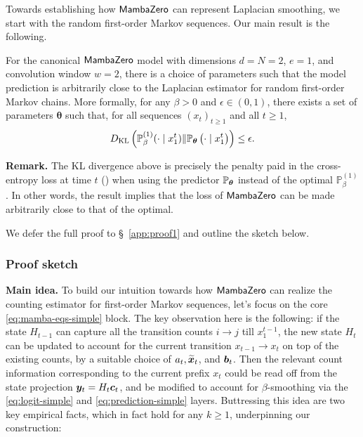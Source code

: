 Towards establishing how $\mathsf{MambaZero}$ can represent Laplacian smoothing, we start with the random first-order Markov sequences. Our main result is the following.

\begin{theorem}
\label{thm:order1}
For the canonical $\mathsf{MambaZero}$ model with dimensions $d = N = 2$, $e=1$, and convolution window $w=2$, there is a choice of parameters such that the model prediction is arbitrarily close to the Laplacian estimator for random first-order Markov chains. More formally, for any $\beta > 0$ and $\epsilon \in (0,1)$, there exists a set of parameters $\bm{\theta}$ such that, for all sequences $(x_t)_{t\geq 1}$ and all $t\geq 1$,
\begin{align*}
D_{\rm KL}\left(\mathbb{P}_\beta^{(1)}(\cdot \mid x_1^t) \| \mathbb{P}_{\bm{\theta}}\left(\cdot \mid x_1^t\right)\right) \leq \epsilon.    
\end{align*}
\end{theorem}
{\bf Remark.} The KL divergence above is precisely the penalty paid in the cross-entropy loss at time $t$ () when using the predictor $\mathbb{P}_{\boldsymbol{\theta}}$ instead of the optimal $\mathbb{P}_\beta^{(1)}$. In other words, the result implies that the loss of $\mathsf{MambaZero}$ can be made arbitrarily close to that of the optimal.

We defer the full proof to \S~\ref{app:proof1} and outline the sketch below. 

\subsubsection{Proof sketch}
\label{sec:proof_sketch}
{\bf Main idea.} To build our intuition towards how $\mathsf{MambaZero}$ can realize the \adbeta counting estimator for first-order Markov sequences, let's focus on the core \ref{eq:mamba-eqs-simple} block. The key observation here is the following: if the state $H_{t-1}$ can capture all the transition counts $i \to j$ till $x_{1}^{t-1}$, the new state $H_t$ can be updated to account for the current transition $x_{t-1} \to x_t$ on top of the existing counts, by a suitable choice of $a_t, \widetilde{\boldsymbol{x}}_t$, and $\boldsymbol{b}_t$. Then the relevant count information corresponding to the current prefix $x_t$ could be read off from the state projection $\boldsymbol{y}_t = H_t \boldsymbol{c}_t$, and be modified to account for $\beta$-smoothing via the \ref{eq:logit-simple} and \ref{eq:prediction-simple} layers. Buttressing this idea are two key empirical facts, which in fact hold for any $k \geq 1$, underpinning our construction:

